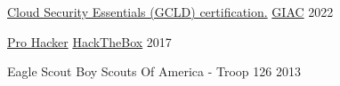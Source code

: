 
\begin{cvhonors}

  \cvhonor
    {\href{https://www.credly.com/badges/844480fc-0193-421c-8813-731f345666d6/}{Cloud Security Essentials (GCLD) certification.}}
    {\href{https://www.giac.org/}{GIAC}}
    {}
    {2022}

  \cvhonor
    {\href{https://app.hackthebox.com/profile/activity/3716}{Pro Hacker}} %
    {\href{https://www.hackthebox.com/}{HackTheBox}} %
    {} %
    {2017} %

  \cvhonor
    {Eagle Scout} %
    {Boy Scouts Of America - Troop 126} %
    {} %
    {2013} %

\end{cvhonors}